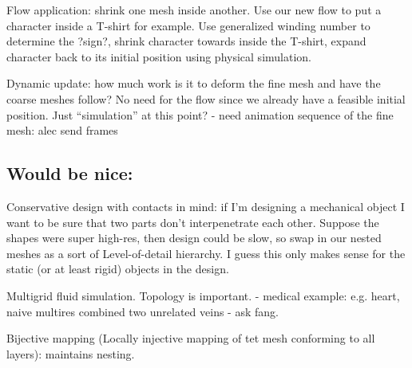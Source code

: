 Flow application: shrink one mesh inside another. Use our new flow to put a 
character inside a T-shirt for example. Use generalized winding number to 
determine the ?sign?, shrink character towards inside the T-shirt, 
expand character back to its initial position using physical simulation. 

Dynamic update: how much work is it to deform the fine mesh and have the coarse
meshes follow? No need for the flow since we already have a feasible initial
position. Just ``simulation'' at this point?
  - need animation sequence of the fine mesh: alec send frames

\subsection{Would be nice:}

Conservative design with contacts in mind: if I'm designing a mechanical object
I want to be sure that two parts don't interpenetrate each other. Suppose the
shapes were super high-res, then design could be slow, so swap in our nested
meshes as a sort of Level-of-detail hierarchy. I guess this only makes sense
for the static (or at least rigid) objects in the design.

Multigrid fluid simulation. Topology is important.
  - medical example: e.g. heart, naive multires combined two unrelated veins
  - ask fang.

Bijective mapping (Locally injective mapping of tet mesh conforming to all
layers): maintains nesting.

